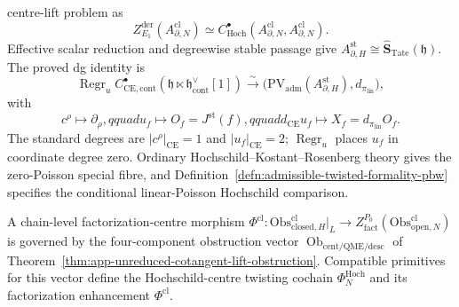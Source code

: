 \documentclass[11pt]{memoir}
\begin{document}
\begin{thm}
  centre-lift problem as
  \[
    Z^{\mathrm{der}}_{E_1}(A^{\mathrm{cl}}_{\partial,N})
     \simeq C^\bullet_{\mathrm{Hoch}}
     (A^{\mathrm{cl}}_{\partial,N},A^{\mathrm{cl}}_{\partial,N}).
  \]
  Effective scalar reduction and degreewise stable passage give
  \(A_{\partial,H}^{\mathrm{st}}\cong
  \widehat{\mathbf S}_{\mathrm{Tate}}(\mathfrak h)\).  The proved dg
  identity is
  \[
    \operatorname{Regr}_u
    C^\bullet_{\mathrm{CE},\mathrm{cont}}
      (\mathfrak h\ltimes\mathfrak h^\vee_{\mathrm{cont}}[1])
    \xrightarrow{\sim}
    \bigl(\mathrm{PV}_{\mathrm{adm}}
      (A_{\partial,H}^{\mathrm{st}}),d_{\pi_{\mathrm{lin}}}\bigr),
  \]
  with
  \[
    c^\rho\longmapsto\partial_\rho,qquad
    u_f\longmapsto O_f=J^{\mathrm{st}}(f),qquad
    d_{\mathrm{CE}}u_f\longmapsto X_f=d_{\pi_{\mathrm{lin}}}O_f.
  \]
  The standard degrees are \(|c^\rho|_{\mathrm{CE}}=1\) and
  \(|u_f|_{\mathrm{CE}}=2\); \(\operatorname{Regr}_u\) places
  \(u_f\) in coordinate degree zero.  Ordinary
  Hochschild--Kostant--Rosenberg theory gives the zero-Poisson special
  fibre, and Definition~\ref{defn:admissible-twisted-formality-pbw}
  specifies the conditional linear-Poisson Hochschild comparison.

  A chain-level factorization-centre morphism
  \(\Phi^{\mathrm{cl}}\colon\mathrm{Obs}^{\mathrm{cl}}_{\mathrm{closed},H}|_L
   \to Z^{P_0}_{\mathrm{fact}}(\mathrm{Obs}^{\mathrm{cl}}_{\mathrm{open},N})\)
  is governed by the four-component obstruction vector
  \(\operatorname{Ob}_{\mathrm{cent/QME/desc}}\) of
  Theorem~\ref{thm:app-unreduced-cotangent-lift-obstruction}.
  Compatible primitives for this vector define the Hochschild-centre
  twisting cochain \(\Phi_N^{\mathrm{Hoch}}\) and its factorization
  enhancement \(\Phi^{\mathrm{cl}}\).
\end{thm}
\end{document}

